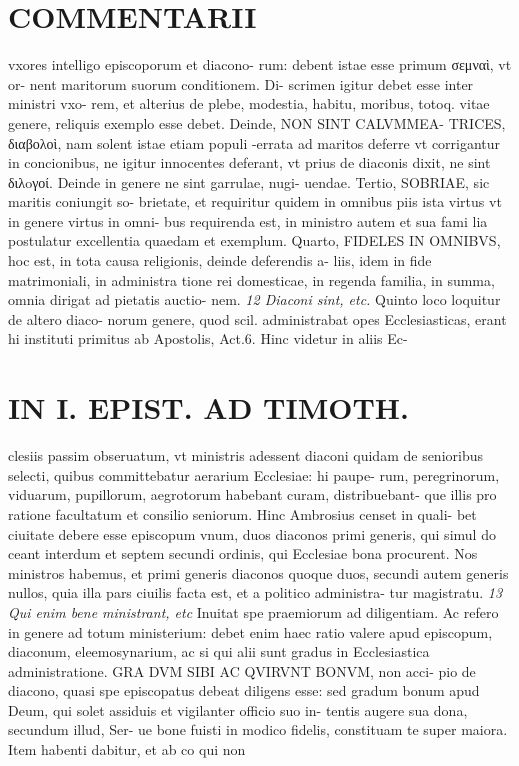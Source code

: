 \documentclass{article}
\begin{document}
\begin{pages}
\section*{COMMENTARII }
\marginpar{[ p.74 ]}\pstart vxores intelligo episcoporum et diacono- rum: debent istae esse primum σεμναὶ, vt or- nent maritorum suorum conditionem. Di- scrimen igitur debet esse inter ministri vxo- rem, et alterius de plebe, modestia, habitu, moribus, totoq. vitae genere, reliquis exemplo esse debet. Deinde, NON SINT CALVMMEA- TRICES, διαβολοὶ, nam solent istae etiam populi -errata ad maritos deferre vt corrigantur in concionibus, ne igitur innocentes deferant, vt prius de diaconis dixit, ne sint διλoγοί. Deinde in genere ne sint garrulae, nugi- uendae.  \pend\pstart Tertio, SOBRIAE, sic maritis coniungit so- brietate, et requiritur quidem in omnibus piis ista virtus vt in genere virtus in omni- bus requirenda est, in ministro autem et sua fami lia postulatur excellentia quaedam et exemplum.  \pend\pstart Quarto, FIDELES IN OMNIBVS, hoc est, in tota causa religionis, deinde deferendis a- liis, idem in fide matrimoniali, in administra tione rei domesticae, in regenda familia, in summa, omnia dirigat ad pietatis auctio- nem.  \pend
\textit{12 Diaconi sint, etc. }\pstart Quinto loco loquitur de altero diaco- norum genere, quod scil. administrabat opes Ecclesiasticas, erant hi instituti primitus ab Apostolis, Act.6. Hinc videtur in aliis Ec-  \pend
\section*{IN I. EPIST. AD TIMOTH. }
\marginpar{[ p.75 ]}\pstart clesiis passim obseruatum, vt ministris adessent diaconi quidam de senioribus selecti, quibus committebatur aerarium Ecclesiae: hi paupe- rum, peregrinorum, viduarum, pupillorum, aegrotorum habebant curam, distribuebant- que illis pro ratione facultatum et consilio seniorum. Hinc Ambrosius censet in quali- bet ciuitate debere esse episcopum vnum, duos diaconos primi generis, qui simul do ceant interdum et septem secundi ordinis, qui Ecclesiae bona procurent. Nos ministros habemus, et primi generis diaconos quoque duos, secundi autem generis nullos, quia illa pars ciuilis facta est, et a politico administra- tur magistratu.  \pend
\textit{13 Qui enim bene ministrant, etc }\pstart Inuitat spe praemiorum ad diligentiam. Ac refero in genere ad totum ministerium: debet enim haec ratio valere apud episcopum, diaconum, eleemosynarium, ac si qui alii sunt gradus in Ecclesiastica administratione. GRA DVM SIBI AC QVIRVNT BONVM, non acci- pio de diacono, quasi spe episcopatus debeat diligens esse: sed gradum bonum apud Deum, qui solet assiduis et vigilanter officio suo in- tentis augere sua dona, secundum illud, Ser- ue bone fuisti in modico fidelis, constituam te super maiora.  \pend\pstart Item habenti dabitur, et ab co qui non  \pend

\end{pages}
\end{document}

